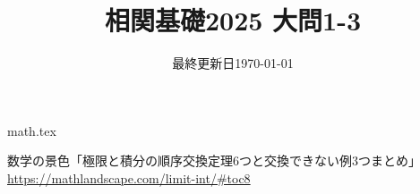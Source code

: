 \documentclass{jlreq}
\title{相関基礎2025 大問1-3}
\author{\emoji{deciduous-tree}}
\date{最終更新日\today }
\begin{document}
\maketitle
  
{math.tex}
  
\begin{thebibliography}{99}
    数学の景色「極限と積分の順序交換定理6つと交換できない例3つまとめ」\url{https://mathlandscape.com/limit-int/#toc8}
\end{thebibliography}
  
\end{document}
